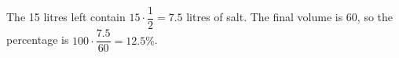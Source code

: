 The 15 litres left contain $15\cdot\dfrac{1}{2}=7.5$ litres of salt. The final volume is 60, so the percentage is $100\cdot\dfrac{7.5}{60}=\boxed{12.5\%}$.
